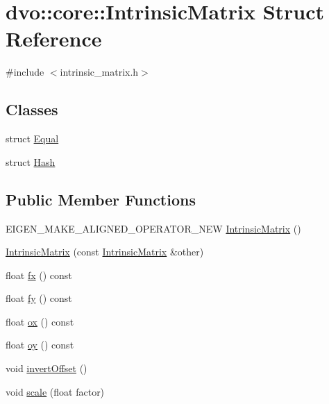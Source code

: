 \hypertarget{structdvo_1_1core_1_1_intrinsic_matrix}{}\section{dvo\+:\+:core\+:\+:Intrinsic\+Matrix Struct Reference}
\label{structdvo_1_1core_1_1_intrinsic_matrix}


{\ttfamily \#include $<$intrinsic\+\_\+matrix.\+h$>$}

\subsection*{Classes}
\begin{DoxyCompactItemize}
\item 
struct \mbox{\hyperlink{structdvo_1_1core_1_1_intrinsic_matrix_1_1_equal}{Equal}}
\item 
struct \mbox{\hyperlink{structdvo_1_1core_1_1_intrinsic_matrix_1_1_hash}{Hash}}
\end{DoxyCompactItemize}
\subsection*{Public Member Functions}
\begin{DoxyCompactItemize}
\item 
E\+I\+G\+E\+N\+\_\+\+M\+A\+K\+E\+\_\+\+A\+L\+I\+G\+N\+E\+D\+\_\+\+O\+P\+E\+R\+A\+T\+O\+R\+\_\+\+N\+EW \mbox{\hyperlink{structdvo_1_1core_1_1_intrinsic_matrix_a2b25541b5d84522454f177f446c5ee2a}{Intrinsic\+Matrix}} ()
\item 
\mbox{\hyperlink{structdvo_1_1core_1_1_intrinsic_matrix_ac7b94dc0f3db8dd63aff0dd6c1315ab4}{Intrinsic\+Matrix}} (const \mbox{\hyperlink{structdvo_1_1core_1_1_intrinsic_matrix}{Intrinsic\+Matrix}} \&other)
\item 
float \mbox{\hyperlink{structdvo_1_1core_1_1_intrinsic_matrix_aa9431c46e33728102f94eed724281aea}{fx}} () const
\item 
float \mbox{\hyperlink{structdvo_1_1core_1_1_intrinsic_matrix_a4d96c81bec804d54ec778a66c822566d}{fy}} () const
\item 
float \mbox{\hyperlink{structdvo_1_1core_1_1_intrinsic_matrix_ae882a75257467c10b0ca5344410b6a3f}{ox}} () const
\item 
float \mbox{\hyperlink{structdvo_1_1core_1_1_intrinsic_matrix_ad0d6657452709e25bbcc7bd7b54b5d5b}{oy}} () const
\item 
void \mbox{\hyperlink{structdvo_1_1core_1_1_intrinsic_matrix_a796dd58464c65afafd8b45d4366b71b4}{invert\+Offset}} ()
\item 
void \mbox{\hyperlink{structdvo_1_1core_1_1_intrinsic_matrix_a425932a5bc42fcde9dc768aecd60f7ef}{scale}} (float factor)
\end{DoxyCompactItemize}
